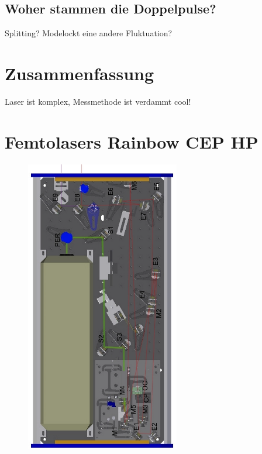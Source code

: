 \documentclass[bachelor,       %
               twoside,        %
               BCOR10mm,       %
               english,ngerman, %
               ]{GAUBM}
\begin{document}
\section{Woher stammen die Doppelpulse?}
Splitting?
Modelockt eine andere Fluktuation?


\chapter{Zusammenfassung}
Laser ist komplex, Messmethode ist verdammt cool!

\appendix
\chapter{Femtolasers Rainbow CEP HP}
\begin{figure}[!htb]
	\centering
	\includegraphics[width=0.6\textwidth]{figures/RainbowSetupManual.png}
\end{figure}
%
%
\end{document}
